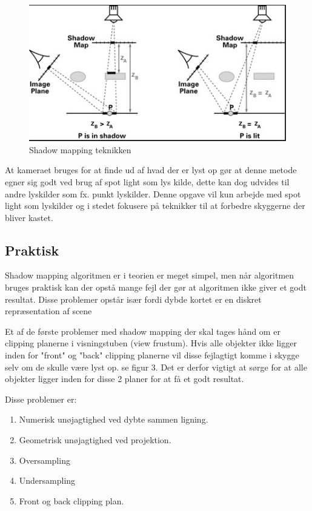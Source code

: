 \documentclass[11pt,a4paper]{article}
\begin{document}
\begin{figure}[ht!]
\centering
\includegraphics[width=140mm]{img/2.png}
\caption{Shadow mapping teknikken}
\label{shadowmapdesc}
\end{figure}


At kameraet bruges for at finde ud af hvad der er lyst op gør at denne metode egner sig godt ved brug af spot light som lys kilde, dette kan dog udvides til andre lyskilder som fx. punkt lyskilder. Denne opgave vil kun arbejde med spot light som lyskilder og i stedet fokusere på teknikker til at forbedre skyggerne der bliver kastet.  


\subsection{Praktisk}


Shadow mapping algoritmen er i teorien er meget simpel, men når algoritmen bruges praktisk kan der opstå mange fejl der gør at algoritmen ikke giver et godt resultat. Disse problemer opstår især fordi dybde kortet er en diskret repræsentation af scene 

Et af de første problemer med shadow mapping der skal tages hånd om er clipping planerne i visningstuben (view frustum). Hvis alle objekter ikke ligger inden for "front"  og "back" clipping planerne vil disse fejlagtigt komme i skygge selv om de skulle være lyst op. se figur 3. Det er derfor vigtigt at sørge for at alle objekter ligger inden for disse 2 planer for at få et godt resultat. 


Disse problemer er:
\begin{enumerate}
\item Numerisk unøjagtighed ved dybte sammen ligning.
\item Geometrisk unøjagtighed ved projektion.
\item Oversampling
\item Undersampling
\item Front og back clipping plan.
\end{enumerate}
\end{document}
